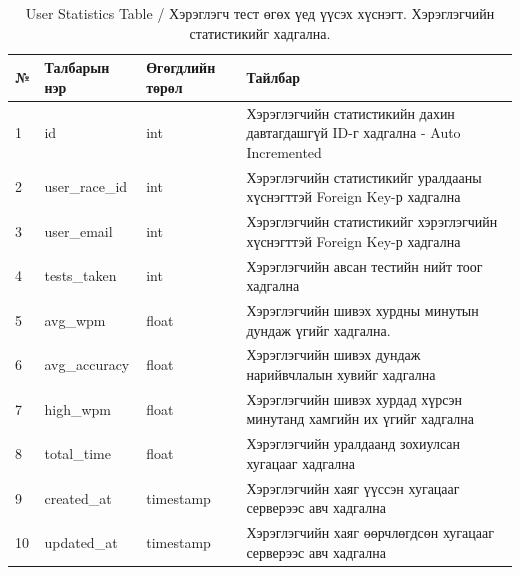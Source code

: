 \begin{table}[h]
	\caption{User Statistics Table / Хэрэглэгч тест өгөх үед үүсэх хүснэгт. Хэрэглэгчийн статистикийг хадгална.}
	\begin{tabular}{|l|l|l|p{8cm}|}
		\hline
		№  & Талбарын нэр   & Өгөгдлийн төрөл & Тайлбар                                                                       \\ \hline
		1  & id             & int             & Хэрэглэгчийн статистикийн дахин давтагдашгүй ID-г хадгална - Auto Incremented \\ \hline
		2  & user\_race\_id & int             & Хэрэглэгчийн статистикийг уралдааны хүснэгттэй Foreign Key-р хадгална         \\ \hline
		3  & user\_email    & int             & Хэрэглэгчийн статистикийг хэрэглэгчийн хүснэгттэй Foreign Key-р хадгална      \\ \hline
		4  & tests\_taken   & int             & Хэрэглэгчийн авсан тестийн нийт тоог хадгална                                 \\ \hline
		5  & avg\_wpm       & float           & Хэрэглэгчийн шивэх хурдны минутын дундаж үгийг хадгална.                      \\ \hline
		6  & avg\_accuracy  & float           & Хэрэглэгчийн шивэх дундаж нарийвчлалын хувийг хадгална                        \\ \hline
		7  & high\_wpm      & float           & Хэрэглэгчийн шивэх хурдад хүрсэн минутанд хамгийн их үгийг хадгална           \\ \hline
		8  & total\_time    & float           & Хэрэглэгчийн уралдаанд зохиулсан хугацааг хадгална                            \\ \hline
		9  & created\_at    & timestamp       & Хэрэглэгчийн хаяг үүссэн хугацааг серверээс авч хадгална                      \\ \hline
		10 & updated\_at    & timestamp       & Хэрэглэгчийн хаяг өөрчлөгдсөн хугацааг серверээс авч хадгална                 \\ \hline
	\end{tabular}
\end{table}



